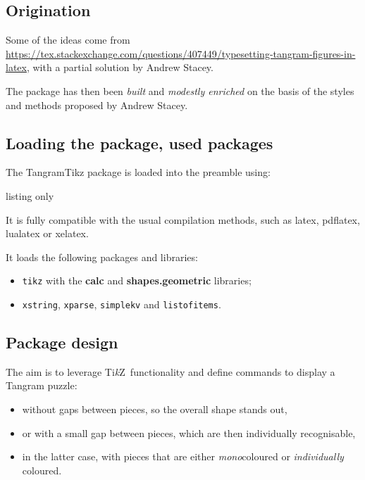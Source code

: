 \documentclass{article}
\providecommand\tikzlogo{Ti\textit{k}Z}
\let\TikZ\tikzlogo
\newcommand\Cle[1]{{\bfseries\sffamily\textlangle #1\textrangle}}
\begin{document}
\subsection{Origination}

Some of the ideas come from \url{https://tex.stackexchange.com/questions/407449/typesetting-tangram-figures-in-latex}, with a partial solution by Andrew Stacey.

\smallskip

The package has then been \textit{built} and \emph{modestly enriched} on the basis of the styles and methods proposed by Andrew Stacey.

\subsection{Loading the package, used packages}

The \textsf{TangramTikz} package is loaded into the preamble using:

\begin{PresentationCode}{listing only}
\usepackage{TangramTikz}
\end{PresentationCode}

It is fully compatible with the usual compilation methods, such as \textsf{latex}, \textsf{pdflatex}, \textsf{lualatex} or \textsf{xelatex}.

\medskip

It loads the following packages and libraries:

\begin{itemize}
	\item \texttt{tikz} with the \Cle{calc} and \Cle{shapes.geometric} libraries;
	\item \texttt{xstring}, \texttt{xparse}, \texttt{simplekv} and \texttt{listofitems}.
\end{itemize}

\subsection{Package design}

The aim is to leverage \TikZ\ functionality and define \textsf{commands} to display a Tangram puzzle:

\begin{itemize}
	\item without gaps between pieces, so the overall shape stands out,
	\item or with a small gap between pieces, which are then individually recognisable,
	\item in the latter case, with pieces that are either \textit{mono}coloured or \emph{individually} coloured.
\end{itemize}
\end{document}

